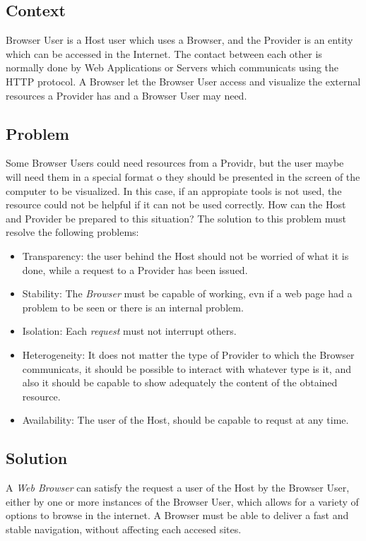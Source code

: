 \documentclass{sig-alternate-05-2015}
\begin{document}
  \subsection*{Context}
  Browser User is a Host user which uses a Browser, and the Provider is an entity which can be accessed in the Internet. The contact between each other is normally done by Web Applications or Servers which communicats using the HTTP protocol. A Browser let the Browser User access and visualize the external resources a Provider has and a Browser User may need.
  
  \subsection*{Problem}
  Some Browser Users could need resources from a Providr, but the user maybe will need them in a special format o they should be presented in the screen of the computer to be visualized. In this case, if an appropiate tools is not used, the resource could not be helpful if it can not be used correctly. How can the Host and Provider be prepared to this situation? The solution to this problem must resolve the following problems:
  \begin{itemize}
    \item Transparency: the user behind the Host should not be worried of what it is done, while a request to a Provider has been issued. 
    \item Stability: The \textit{Browser} must be capable of working, evn if a web page had a problem to be seen or there is an internal problem.
    \item Isolation: Each \textit{request} must not interrupt others.
    \item Heterogeneity: It does not matter the type of Provider to which the Browser communicats, it should be possible to interact with whatever type is it, and also it should be capable to show adequately the content of the obtained resource.
    \item Availability: The user of the Host, should be capable to requst at any time.
  \end{itemize}

  \subsection*{Solution}
  A \textit{Web Browser} can satisfy the request a user of the Host by the Browser User, either by one or more instances of the Browser User, which allows for a variety of options to browse in the internet. A Browser must be able to deliver a fast and stable navigation, without affecting each accesed sites.
\end{document}
